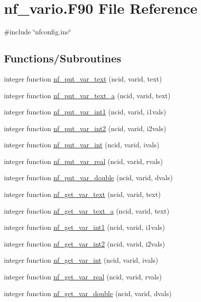 \hypertarget{nf__vario_8F90}{}\section{nf\+\_\+vario.\+F90 File Reference}
\label{nf__vario_8F90}
{\ttfamily \#include \char`\"{}nfconfig.\+inc\char`\"{}}\newline
\subsection*{Functions/\+Subroutines}
\begin{DoxyCompactItemize}
\item 
integer function \hyperlink{nf__vario_8F90_abd6a4aca3c29d6b23ca79993d33f2a90}{nf\+\_\+put\+\_\+var\+\_\+text} (ncid, varid, text)
\item 
integer function \hyperlink{nf__vario_8F90_afe3929ce3dfe52d8cfdc862c8100c8f1}{nf\+\_\+put\+\_\+var\+\_\+text\+\_\+a} (ncid, varid, text)
\item 
integer function \hyperlink{nf__vario_8F90_a6eaf0723d97365848a4c50ce8e068583}{nf\+\_\+put\+\_\+var\+\_\+int1} (ncid, varid, i1vals)
\item 
integer function \hyperlink{nf__vario_8F90_a6dcf362466db413504084fdb0c8addf2}{nf\+\_\+put\+\_\+var\+\_\+int2} (ncid, varid, i2vals)
\item 
integer function \hyperlink{nf__vario_8F90_a72a906ed700444202359dcf3c88b1e8c}{nf\+\_\+put\+\_\+var\+\_\+int} (ncid, varid, ivals)
\item 
integer function \hyperlink{nf__vario_8F90_a177ab75735fe71acce3e96be7e2a58d2}{nf\+\_\+put\+\_\+var\+\_\+real} (ncid, varid, rvals)
\item 
integer function \hyperlink{nf__vario_8F90_a64f5364aa86cc599ddf5af66097135fb}{nf\+\_\+put\+\_\+var\+\_\+double} (ncid, varid, dvals)
\item 
integer function \hyperlink{nf__vario_8F90_ac95762460f981c284b4f1e5fc705cbbd}{nf\+\_\+get\+\_\+var\+\_\+text} (ncid, varid, text)
\item 
integer function \hyperlink{nf__vario_8F90_a9d1f932f41722534e26250b4fa2153b3}{nf\+\_\+get\+\_\+var\+\_\+text\+\_\+a} (ncid, varid, text)
\item 
integer function \hyperlink{nf__vario_8F90_a021297a633b5d3c578d9054f4249e4f4}{nf\+\_\+get\+\_\+var\+\_\+int1} (ncid, varid, i1vals)
\item 
integer function \hyperlink{nf__vario_8F90_ad3103564244c9eddfc1615048642a2db}{nf\+\_\+get\+\_\+var\+\_\+int2} (ncid, varid, i2vals)
\item 
integer function \hyperlink{nf__vario_8F90_aba37d2fec3b6f8fb25e43339250894f7}{nf\+\_\+get\+\_\+var\+\_\+int} (ncid, varid, ivals)
\item 
integer function \hyperlink{nf__vario_8F90_a8cffe87483851c5d94582142c0911009}{nf\+\_\+get\+\_\+var\+\_\+real} (ncid, varid, rvals)
\item 
integer function \hyperlink{nf__vario_8F90_a15442abba3da75d4a3406f403b623a4e}{nf\+\_\+get\+\_\+var\+\_\+double} (ncid, varid, dvals)
\end{DoxyCompactItemize}


